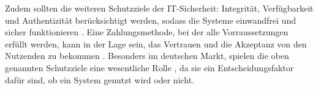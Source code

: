 










Zudem sollten die weiteren Schutzziele der IT-Sicherheit: Integrität, Verfügbarkeit und Authentizität
berücksichtigt werden, sodass die Systeme einwandfrei und sicher funktionieren \cite{refip:GMPS}. 
Eine Zahlungsmethode, bei der alle Vorraussetzungen erfüllt werden, kann in der Lage sein, das Vertrauen 
und die Akzeptanz von den Nutzenden zu bekommen \cite{refart:HARE}. Besonders im deutschen Markt, spielen
die oben genannten Schutzziele eine wesentliche Rolle \cite{refip:DKAM}, da sie ein Entscheidungsfaktor 
dafür sind, ob ein System genutzt wird oder nicht.


